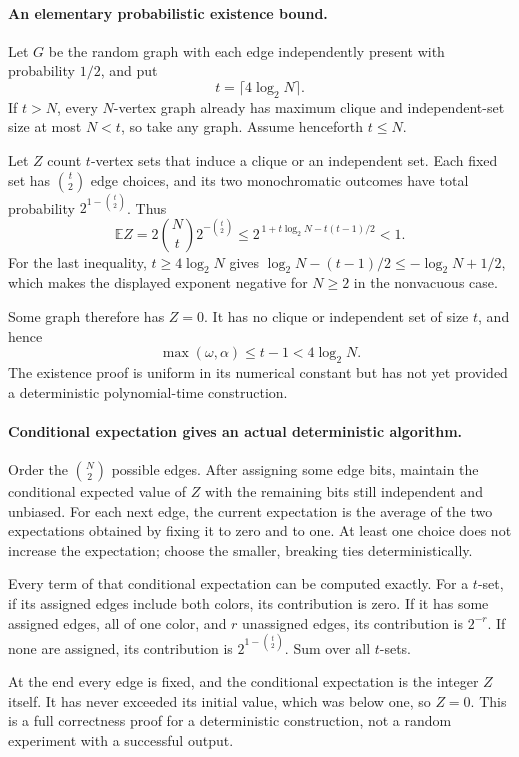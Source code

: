 \documentclass[11pt]{article}
\begin{document}
\paragraph{An elementary probabilistic existence bound.}
Let $G$ be the random graph with each edge independently present with probability $1/2$, and put
\[
 t=\lceil4\log_2N\rceil.
\]
If $t>N$, every $N$-vertex graph already has maximum clique and independent-set size at most $N<t$, so take any graph. Assume henceforth $t\le N$.

Let $Z$ count $t$-vertex sets that induce a clique or an independent set. Each fixed set has $\binom t2$ edge choices, and its two monochromatic outcomes have total probability $2^{1-\binom t2}$. Thus
\[
 \mathbb EZ=2\binom Nt2^{-\binom t2}
       \le 2^{\,1+t\log_2N-t(t-1)/2}<1.
 \tag{280.1}
\]
For the last inequality, $t\ge4\log_2N$ gives
$\log_2N-(t-1)/2\le-\log_2N+1/2$, which makes the displayed exponent negative for $N\ge2$ in the nonvacuous case.

Some graph therefore has $Z=0$. It has no clique or independent set of size $t$, and hence
\[
 \max(\omega,\alpha)\le t-1<4\log_2N.
\]
The existence proof is uniform in its numerical constant but has not yet provided a deterministic polynomial-time construction.

\paragraph{Conditional expectation gives an actual deterministic algorithm.}
Order the $\binom N2$ possible edges. After assigning some edge bits, maintain the conditional expected value of $Z$ with the remaining bits still independent and unbiased. For each next edge, the current expectation is the average of the two expectations obtained by fixing it to zero and to one. At least one choice does not increase the expectation; choose the smaller, breaking ties deterministically.

Every term of that conditional expectation can be computed exactly. For a $t$-set, if its assigned edges include both colors, its contribution is zero. If it has some assigned edges, all of one color, and $r$ unassigned edges, its contribution is $2^{-r}$. If none are assigned, its contribution is $2^{1-\binom t2}$. Sum over all $t$-sets.

At the end every edge is fixed, and the conditional expectation is the integer $Z$ itself. It has never exceeded its initial value, which was below one, so $Z=0$. This is a full correctness proof for a deterministic construction, not a random experiment with a successful output.
\end{document}
